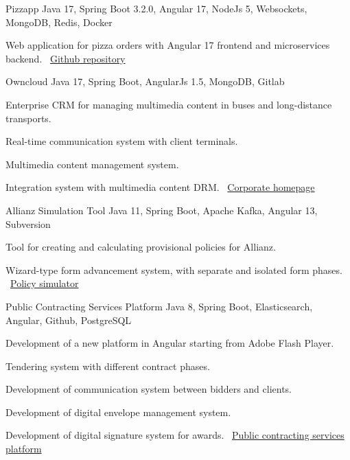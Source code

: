 \documentclass[]{awesome-cv}
\begin{document}
\begin{cventries}
    \cventry
    {}
    {Pizzapp}
    {Java 17, Spring Boot 3.2.0, Angular 17, NodeJs 5, Websockets, MongoDB, Redis, Docker}
    {}
    {\begin{cvitems}
        \item {Web application for pizza orders with Angular 17 frontend and microservices backend.
        \newline \faLink\ \href{https://github.com/flautarian/pizzapp}{Github repository}}
    \end{cvitems}}

    \cventry
    {}
    {Owncloud}
    {Java 17, Spring Boot, AngularJs 1.5, MongoDB, Gitlab}
    {}
    {\begin{cvitems}
        \item {Enterprise CRM for managing multimedia content in buses and long-distance transports.}
        \item {Real-time communication system with client terminals.}
        \item {Multimedia content management system.}
        \item {Integration system with multimedia content DRM.
        \newline \faLink\ \href{https://www.azimutelectronics.com}{Corporate homepage}}
    \end{cvitems}}

    \cventry
    {}
    {Allianz Simulation Tool}
    {Java 11, Spring Boot, Apache Kafka, Angular 13, Subversion}
    {}
    {\begin{cvitems}
        \item {Tool for creating and calculating provisional policies for Allianz.}
        \item {Wizard-type form advancement system, with separate and isolated form phases.
        \newline \faLink\ \href{https://www.allianzdirect.es/seguro-de-coche/calcular-precio/}{Policy simulator}}
    \end{cvitems}}

    \cventry
    {}
    {Public Contracting Services Platform}
    {Java 8, Spring Boot, Elasticsearch, Angular, Github, PostgreSQL}
    {}
    {\begin{cvitems}
        \item {Development of a new platform in Angular starting from Adobe Flash Player.}
        \item {Tendering system with different contract phases.}
        \item {Development of communication system between bidders and clients.}
        \item {Development of digital envelope management system.}
        \item {Development of digital signature system for awards.
        \newline \faLink\ \href{https://contractaciopublica.cat/ca/inici}{Public contracting services platform}}
    \end{cvitems}}


\end{cventries}
\end{document}
